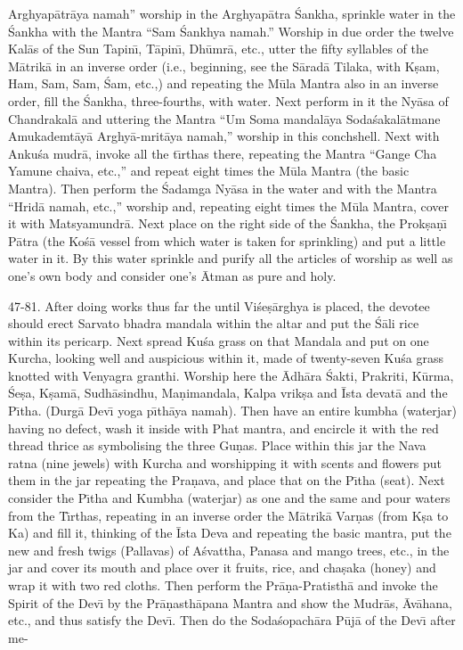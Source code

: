 Arghyap\=atr\=aya namah'' worship in the Arghyap\=atra \'Sankha, sprinkle water in the \'Sankha with the Mantra ``Sam \'Sankhya namah.'' Worship in due order the twelve Kal\=as of the Sun Tapin\={\i}, T\=apin\={\i}, Dh\=umr\=a, etc., utter the fifty syllables of the M\=atrik\=a in an inverse order (i.e., beginning, see the S\=arad\=a Tilaka, with K\d{s}am, Ham, Sam, Sam, \'Sam, etc.,) and repeating the M\=ula Mantra also in an inverse order, fill the \'Sankha, three-fourths, with water. Next perform in it the Ny\=asa of Chandrakal\=a and uttering the Mantra ``Um Soma mandal\=aya Soda\'sakal\=atmane Amukademt\=ay\=a Arghy\=a-mrit\=aya namah,'' worship in this conchshell. Next with Anku\'sa mudr\=a, invoke all the t\={\i}rthas there, repeating the Mantra ``Gange Cha Yamune chaiva, etc.,'' and repeat eight times the M\=ula Mantra (the basic Mantra). Then perform the \'Sadamga Ny\=asa in the water and with the Mantra ``Hrid\=a namah, etc.,'' worship and, repeating eight times the M\=ula Mantra, cover it with Matsyamundr\=a. Next place on the right side of the \'Sankha, the Prok\d{s}a\d{n}\={\i} P\=atra (the Ko\'s\=a vessel from which water is taken for sprinkling) and put a little water in it. By this water sprinkle and purify all the articles of worship as well as one's own body and consider one's \=Atman as pure and holy.

47-81. After doing works thus far the until Vi\'se\d{s}\=arghya is placed, the devotee should erect Sarvato bhadra mandala within the altar and put the \'S\=ali rice within its pericarp. Next spread Ku\'sa grass on that Mandala and put on one Kurcha, looking well and auspicious within it, made of twenty-seven Ku\'sa grass knotted with Venyagra granthi. Worship here the \=Adh\=ara \'Sakti, Prakriti, K\=urma, \'Se\d{s}a, K\d{s}am\=a, Sudh\=asindhu, Ma\d{n}imandala, Kalpa vrik\d{s}a and \=Ista devat\=a and the P\={\i}tha. (Durg\=a Dev\={\i} yoga p\={\i}th\=aya namah). Then have an entire kumbha (waterjar) having no defect, wash it inside with Phat mantra, and encircle it with the red thread thrice as symbolising the three Gu\d{n}as. Place within this jar the Nava ratna (nine jewels) with Kurcha and worshipping it with scents and flowers put them in the jar repeating the Pra\d{n}ava, and place that on the P\={\i}tha (seat). Next consider the P\={\i}tha and Kumbha (waterjar) as one and the same and pour waters from the T\={\i}rthas, repeating in an inverse order the M\=atrik\=a Var\d{n}as (from K\d{s}a to Ka) and fill it, thinking of the \=Ista Deva and repeating the basic mantra, put the new and fresh twigs (Pallavas) of A\'svattha, Panasa and mango trees, etc., in the jar and cover its mouth and place over it fruits, rice, and cha\d{s}aka (honey) and wrap it with two red cloths. Then perform the Pr\=a\d{n}a-Pratisth\=a and invoke the Spirit of the Dev\={\i} by the Pr\=a\d{n}asth\=apana Mantra and show the Mudr\=as, \=Av\=ahana, etc., and thus satisfy the Dev\={\i}. Then do the Soda\'sopach\=ara P\=uj\=a of the Dev\={\i} after me-

